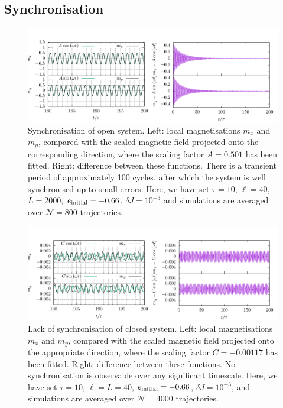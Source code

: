 \documentclass[aps,pre,twocolumn,notitlepage,floats,10pt]{revtex4-1}
\begin{document}
\subsection{Synchronisation} \label{sec:sync}
\begin{figure}[!ht]
  \includegraphics[width=\linewidth]{figs/fig-6-sync-open.pdf}
  \caption{
  Synchronisation of open system.
  Left: local magnetisations $m_x$ and $m_y$, compared with the scaled
  magnetic field projected onto the corresponding direction, where the scaling
  factor $A=0.501$ has been fitted.
  Right: difference between these functions. There is a transient period of
  approximately 100 cycles, after which the system is well synchronised up to
  small errors.
  Here, we have set $\tau = 10$, $\ell = 40$, $L=2000$, $e_{\rm
        initial}=-0.66$, $\delta J =10^{-3}$ and simulations are averaged over
  $\mathcal{N}=800$ trajectories.
  } \label{fig:closed-sync}
\end{figure}

\begin{figure}[!ht]
  \includegraphics[width=\linewidth]{figs/fig-7-sync-closed.pdf}
  \caption{
    Lack of synchronisation of closed system.
    Left: local magnetisations $m_x$ and $m_y$, compared with the scaled
    magnetic field projected onto the appropriate direction, where the scaling
    factor $C=-0.00117$ has been fitted.
    Right: difference between these functions.
    No synchronisation is observable over any significant timescale.
    Here, we have set $\tau = 10$, $\ell=L=40$, $e_{\rm initial} = -0.66$,
    $\delta J = 10^{-3}$, and simulations are averaged over $\mathcal{N}=4000$
    trajectories.
  } \label{fig:open-sync}
\end{figure}
\end{document}
